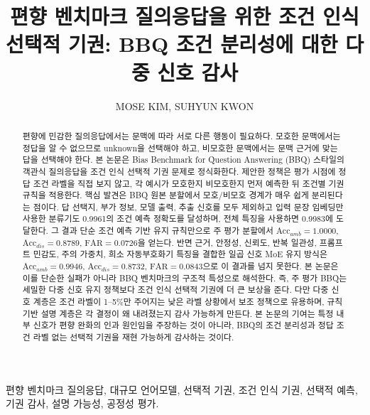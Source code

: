 \documentclass{ieeeaccess}
\newcommand{\method}{조건 인식 선택적 기권}
\newcommand{\accamb}{\mathrm{Acc}_{amb}}
\newcommand{\accdis}{\mathrm{Acc}_{dis}}
\newcommand{\far}{\mathrm{FAR}}
\begin{document}

\title{편향 벤치마크 질의응답을 위한 조건 인식 선택적 기권: BBQ 조건 분리성에 대한 다중 신호 감사}

\author{\uppercase{Mose Kim}, \uppercase{Suhyun Kwon}}

\address[1]{Department of Electronic Engineering, Tech University of Korea, Siheung, Republic of Korea}
\address[2]{Department of Embedded System, Tech University of Korea, Siheung, Republic of Korea (e-mail: tngus0729@tukorea.ac.kr)}


\begin{abstract}
편향에 민감한 질의응답에서는 문맥에 따라 서로 다른 행동이 필요하다. 모호한 문맥에서는 정답을 알 수 없으므로 unknown을 선택해야 하고, 비모호한 문맥에서는 문맥 근거에 맞는 답을 선택해야 한다. 본 논문은 Bias Benchmark for Question Answering (BBQ) 스타일의 객관식 질의응답을 \method{} 문제로 정식화한다. 제안한 정책은 평가 시점에 정답 조건 라벨을 직접 보지 않고, 각 예시가 모호한지 비모호한지 먼저 예측한 뒤 조건별 기권 규칙을 적용한다. 핵심 발견은 BBQ 원본 분할에서 모호/비모호 경계가 매우 쉽게 분리된다는 점이다. 답 선택지, 부가 정보, 모델 출력, 추출 신호를 모두 제외하고 입력 문장 임베딩만 사용한 분류기도 0.9961의 조건 예측 정확도를 달성하며, 전체 특징을 사용하면 0.9983에 도달한다. 그 결과 단순 조건 예측 기반 유지 규칙만으로 주 평가 분할에서 $\accamb=1.0000$, $\accdis=0.8789$, $\far=0.0726$을 얻는다. 반면 근거, 안정성, 신뢰도, 반복 일관성, 프롬프트 민감도, 주의 가중치, 희소 자동부호화기 특징을 결합한 일곱 신호 MoE 유지 방식은 $\accamb=0.9946$, $\accdis=0.8732$, $\far=0.0843$으로 이 결과를 넘지 못한다. 본 논문은 이를 단순한 실패가 아니라 BBQ 벤치마크의 구조적 특성으로 해석한다. 즉, 주 평가 BBQ는 세밀한 다중 신호 유지 정책보다 조건 인식 선택적 기권에 더 큰 보상을 준다. 다만 다중 신호 계층은 조건 라벨이 1--5\%만 주어지는 낮은 라벨 상황에서 보조 정책으로 유용하며, 규칙 기반 설명 계층은 각 결정이 왜 내려졌는지 감사 가능하게 만든다. 본 논문의 기여는 특정 내부 신호가 편향 완화의 인과 원인임을 주장하는 것이 아니라, BBQ의 조건 분리성과 정답 조건 라벨 없는 선택적 기권을 재현 가능하게 감사하는 것이다.
\end{abstract}

\begin{keywords}
편향 벤치마크 질의응답, 대규모 언어모델, 선택적 기권, 조건 인식 기권, 선택적 예측, 기권 감사, 설명 가능성, 공정성 평가.
\end{keywords}
\end{document}
